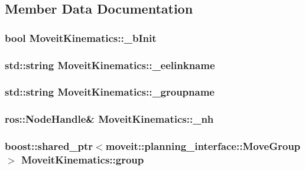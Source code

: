 \subsection{Member Data Documentation}
\hypertarget{classMoveitKinematics_aa03e65371bb97fce4c98cbb46e53f423}{
\subsubsection[{\-\_\-b\-Init}]{\setlength{\rightskip}{0pt plus 5cm}bool Moveit\-Kinematics\-::\-\_\-b\-Init}}\label{classMoveitKinematics_aa03e65371bb97fce4c98cbb46e53f423}
\hypertarget{classMoveitKinematics_a5a97c1d7f715983995df78a442901c9e}{
\subsubsection[{\-\_\-eelinkname}]{\setlength{\rightskip}{0pt plus 5cm}std\-::string Moveit\-Kinematics\-::\-\_\-eelinkname}}\label{classMoveitKinematics_a5a97c1d7f715983995df78a442901c9e}
\hypertarget{classMoveitKinematics_afb7a90e3cda4da3b515a6e4cc19babe2}{
\subsubsection[{\-\_\-groupname}]{\setlength{\rightskip}{0pt plus 5cm}std\-::string Moveit\-Kinematics\-::\-\_\-groupname}}\label{classMoveitKinematics_afb7a90e3cda4da3b515a6e4cc19babe2}
\hypertarget{classMoveitKinematics_acea7424509f44c5f77f379f356a547c8}{
\subsubsection[{\-\_\-nh}]{\setlength{\rightskip}{0pt plus 5cm}ros\-::\-Node\-Handle\& Moveit\-Kinematics\-::\-\_\-nh}}\label{classMoveitKinematics_acea7424509f44c5f77f379f356a547c8}
\hypertarget{classMoveitKinematics_a3581661c4c9d14201a64a8143f51da3e}{
\subsubsection[{group}]{\setlength{\rightskip}{0pt plus 5cm}boost\-::shared\-\_\-ptr$<$moveit\-::planning\-\_\-interface\-::\-Move\-Group$>$ Moveit\-Kinematics\-::group}}\label{classMoveitKinematics_a3581661c4c9d14201a64a8143f51da3e}
